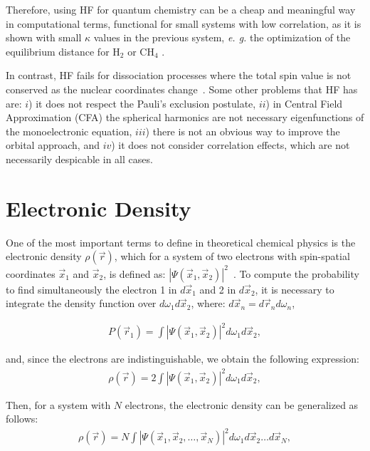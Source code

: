 Therefore, using HF for quantum chemistry can be a cheap and meaningful way in
computational terms, functional for small systems with low correlation, as it
is shown with small $\kappa$ values in the previous system, \textit{e.  g.} the
optimization of the equilibrium distance for H$_2$ or CH$_4$
\cite{defrees1982effect}.

\pagebreak

In contrast, HF fails for dissociation processes where the total spin value is
not conserved as the nuclear coordinates change~\cite{JimnezHoyos2012}.  Some
other problems that HF has are: $i$) it does not respect the Pauli's exclusion
postulate, $ii$) in Central Field Approximation (\gls{CFA}) the spherical
harmonics are not necessary eigenfunctions of the monoelectronic equation,
$iii$) there is not an obvious way to improve the orbital approach, and $iv$)
it does not consider correlation effects, which are not necessarily despicable
in all cases.

\section{Electronic Density}\label{densidades}

One of the most important terms to define in theoretical chemical physics is
the electronic density $\rho (\vec{r})$, which for a system of two electrons
with spin-spatial coordinates $\vec{x}_{1}$ and $\vec{x}_2$, is defined as:
$|\Psi (\vec{x}_1 ,  \vec{x}_2)|^2$~\cite{RobertG1994}.  To compute the
probability to find simultaneously the electron 1 in $d\vec{x}_1$ and 2 in
$d\vec{x}_2$, it is necessary to integrate the density function over $d\omega_1
d\vec{x}_2$, where: $d\vec{x}_n =  d\vec{r}_n d\omega_n$,

%
\begin{align}
  P(\vec{r}_1)=\int |\Psi (\vec{x}_1 ,  \vec{x}_2)|^2 d\omega_1 d\vec{x}_2 ,
\end{align}

\noindent and, since the electrons are indistinguishable, we obtain the following expression:
%
\begin{align}
  \rho(\vec{r})=2\int |\Psi (\vec{x}_1 ,  \vec{x}_2)|^2 d\omega_1 d\vec{x}_2 ,
\end{align}

\noindent Then, for a system with $N$ electrons, the electronic density can be
generalized as follows:
%
\begin{align}
  \rho(\vec{r})=N\int |\Psi (\vec{x}_1 ,  \vec{x}_2,  \ldots , \vec{x}_N)|^2
  d\omega_1 d\vec{x}_2 \ldots d\vec{x}_N ,
\label{definition}
\end{align}

